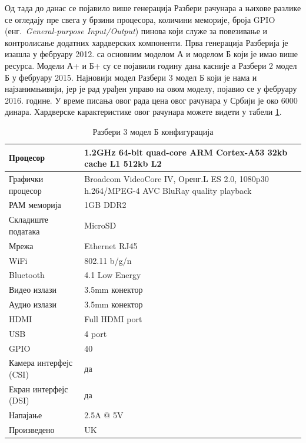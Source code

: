\documentclass[12pt,oneside]{memoir}
\theoremstyle{remark}
\begin{document}
Од тада до данас се појавило више генерација Разбери рачунара а њихове разлике се огледају пре свега у брзини процесора, количини меморије, броја GPIO (енг.~{\em General-purpose Input/Output}) пинова који служе за повезивање и контролисање додатних хардверских компоненти. Прва генерација Разберија је изашла у фебруару 2012. са основним моделом А и моделом Б који је имао више ресурса. Модели А+ и Б+ су се појавили годину дана касније а Разбери 2 модел Б у фебруару 2015. Најновији модел Разбери 3 модел Б који је нама и најзанимњивији, јер је рад урађен управо на овом моделу, појавио се у фебруару 2016. године. У време писања овог рада цена овог рачунара у Србији је око 6000 динара. Хардверске карактеристике овог рачунара можете видети у табели \ref{tbl:rpikonfiguracija}.

\begin{table}
\centering
\caption{Разбери 3 модел Б конфигурација}
\label{tbl:rpikonfiguracija}
\begin{tabular}{ |p{4cm}||p{10cm}|}
	\hline
	Процесор & 1.2GHz 64-bit quad-core ARM Cortex-A53 32kb cache L1 512kb L2\\
	\hline
	Графички процесор & Broadcom VideoCore IV, Opенг.L ES 2.0, 1080p30 h.264/MPEG-4 AVC BluRay quality playback\\
	\hline
	РАМ меморија &  1GB DDR2\\
	\hline
	Складиште података & MicroSD\\
	\hline
	Мрежа & Ethernet RJ45\\
	\hline	
	WiFi & 802.11 b/g/n\\
	\hline
	Bluetooth & 4.1  Low Energy\\
	\hline
	Видео излази & 3.5mm конектор\\
	\hline
	Аудио излази & 3.5mm конектор\\
	\hline
	HDMI & Full HDMI port\\
	\hline
	USB & 4 port\\
	\hline
	GPIO & 40\\
	\hline
	Камера интерфејс (CSI) & да\\
	\hline
	Екран интерфејс (DSI) & да\\
	\hline
	Напајање &  2.5A @ 5V\\
	\hline
	Произведено & UK\\
	\hline
\end{tabular}
\end{table}
\end{document}
